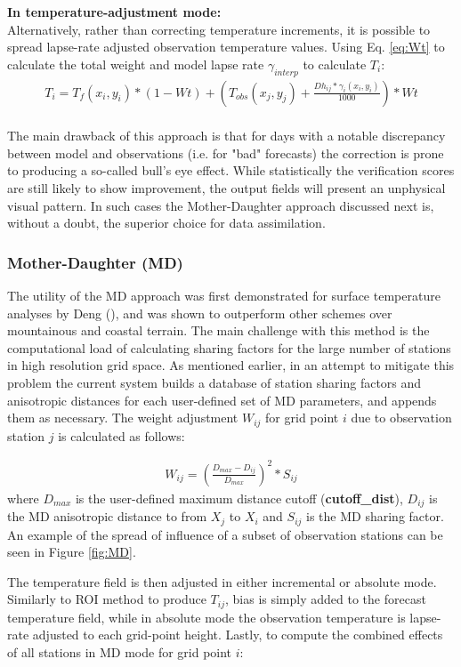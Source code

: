 \documentclass{article}
\begin{document}
\noindent\textbf{In temperature-adjustment mode:}\\
Alternatively, rather than correcting temperature increments, it is possible to spread lapse-rate adjusted observation temperature values. Using Eq. \ref{eq:Wt} to calculate the total weight and model lapse rate $\gamma_{interp}$ to calculate $T_i$:
\begin{eqnarray}
T_i = T_f(x_i,y_i) * (1-Wt) + (T_{obs}(x_j,y_j)+ \frac{Dh_{ij}*\gamma_{i}(x_i,y_i)}{1000})*Wt
\end{eqnarray}
\\
The main drawback of this approach is that for days with a notable discrepancy between model and observations (i.e. for "bad" forecasts) the correction is prone to producing a so-called bull's eye effect. While statistically the verification scores are still likely to show improvement, the output fields will present an unphysical visual pattern. In such cases the Mother-Daughter approach discussed next is, without a doubt, the superior choice for data assimilation.

\subsubsection{Mother-Daughter (MD)}
The utility of the MD approach was first demonstrated for surface temperature analyses by Deng (\cite{Deng2005}), and was shown to outperform other schemes over mountainous and coastal terrain. The main challenge with this method is the computational load of calculating sharing factors for the large number of stations in high resolution grid space. As mentioned earlier, in an attempt to mitigate this problem the current system builds a database of station sharing factors and anisotropic distances for each user-defined set of MD parameters, and appends them as necessary. The weight adjustment $W_{ij}$ for grid point $i$ due to observation station $j$ is calculated as follows:

\begin{eqnarray}
W_{ij} = (\frac{D_{max} - D_{ij}}{D_{max}})^2 * S_{ij}
\end{eqnarray}
where $D_{max}$ is the user-defined maximum distance cutoff (\textbf{cutoff\_dist}), $D_{ij}$ is the MD anisotropic distance to from $X_j$ to $X_i$ and $S_{ij}$ is the MD sharing factor. An example of the spread of influence of a subset of observation stations can be seen in Figure \ref{fig:MD}.

The temperature field is then adjusted in either incremental or absolute mode. Similarly to ROI method to produce $T_{ij}$, bias is simply added to the forecast temperature field, while in absolute mode the observation temperature is lapse-rate adjusted to each grid-point height. Lastly, to compute the combined effects of all stations in MD mode for grid point $i$:
\end{document}
